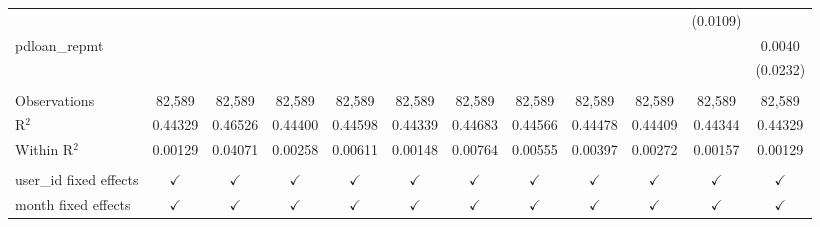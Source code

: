 \begin{table}[htbp]
\begin{tiny}
\begin{tabular}{lccccccccccc}
                                 &                 &                 &                 &                 &                 &                 &                 &                 &                 & (0.0109)        &   \\
         pdloan\_repmt          &                 &                 &                 &                 &                 &                 &                 &                 &                 &                 & 0.0040\\
                                 &                 &                 &                 &                 &                 &                 &                 &                 &                 &                 & (0.0232)\\
                                 &                 &                 &                 &                 &                 &                 &                 &                 &                 &                 &  \\
         Observations            & 82,589          & 82,589          & 82,589          & 82,589          & 82,589          & 82,589          & 82,589          & 82,589          & 82,589          & 82,589          & 82,589\\
         R$^2$                   & 0.44329         & 0.46526         & 0.44400         & 0.44598         & 0.44339         & 0.44683         & 0.44566         & 0.44478         & 0.44409         & 0.44344         & 0.44329\\
         Within R$^2$            & 0.00129         & 0.04071         & 0.00258         & 0.00611         & 0.00148         & 0.00764         & 0.00555         & 0.00397         & 0.00272         & 0.00157         & 0.00129\\
                                 &                 &                 &                 &                 &                 &                 &                 &                 &                 &                 &  \\
         user\_id fixed effects & $\checkmark$   & $\checkmark$   & $\checkmark$   & $\checkmark$   & $\checkmark$   & $\checkmark$   & $\checkmark$   & $\checkmark$   & $\checkmark$   & $\checkmark$   & $\checkmark$\\
         month fixed effects     & $\checkmark$   & $\checkmark$   & $\checkmark$   & $\checkmark$   & $\checkmark$   & $\checkmark$   & $\checkmark$   & $\checkmark$   & $\checkmark$   & $\checkmark$   & $\checkmark$\\
         \bottomrule
      \end{tabular}
   \end{tiny}
\end{table}


